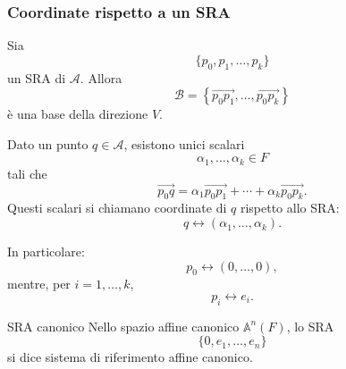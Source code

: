 \documentclass[a4paper]{article}
\begin{document}
\subsubsection{Coordinate rispetto a un SRA}

Sia
\[
    \{p_0,p_1,\ldots,p_k\}
\]
un SRA di \(\mathcal{A}\). Allora
\[
    \mathcal{B}
    =
    \left\{
        \overrightarrow{p_0p_1},
        \ldots,
        \overrightarrow{p_0p_k}
    \right\}
\]
è una base della direzione \(V\).

Dato un punto \(q\in\mathcal{A}\), esistono unici scalari
\[
    \alpha_1,\ldots,\alpha_k\in F
\]
tali che
\[
    \overrightarrow{p_0q}
    =
    \alpha_1\overrightarrow{p_0p_1}
    +\cdots+
    \alpha_k\overrightarrow{p_0p_k}.
\]
Questi scalari si chiamano coordinate di \(q\) rispetto allo SRA:
\[
    q \longleftrightarrow (\alpha_1,\ldots,\alpha_k).
\]

In particolare:
\[
    p_0\longleftrightarrow (0,\ldots,0),
\]
mentre, per \(i=1,\ldots,k\),
\[
    p_i\longleftrightarrow e_i.
\]

\begin{snippetdefinition}{SRA canonico}
    Nello spazio affine canonico \(\mathbb{A}^n(F)\), lo SRA
    \[
        \{0,e_1,\ldots,e_n\}
    \]
    si dice sistema di riferimento affine canonico.
\end{snippetdefinition}
\end{document}
